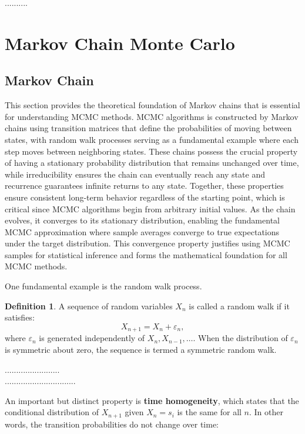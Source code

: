 \documentclass[12pt,a4paper,oneside]{book}
\theoremstyle{definition}
\newtheorem{definition}{Definition}[section]
\begin{document}
..........


\section{Markov Chain Monte Carlo}

\subsection{Markov Chain}

This section provides the theoretical foundation of Markov chains that is essential for understanding MCMC methods. MCMC algorithms is constructed by Markov chains using transition matrices that define the probabilities of moving between states, with random walk processes serving as a fundamental example where each step moves between neighboring states. These chains possess the crucial property of having a stationary probability distribution that remains unchanged over time, while irreducibility ensures the chain can eventually reach any state and recurrence guarantees infinite returns to any state. Together, these properties ensure consistent long-term behavior regardless of the starting point, which is critical since MCMC algorithms begin from arbitrary initial values. As the chain evolves, it converges to its stationary distribution, enabling the fundamental MCMC approximation where sample averages converge to true expectations under the target distribution. This convergence property justifies using MCMC samples for statistical inference and forms the mathematical foundation for all MCMC methods.

One fundamental example is the random walk process.

\begin{definition}
A sequence of random variables ${X_n}$ is called a random walk if it satisfies:
\begin{equation}
X_{n+1} = X_n + \varepsilon_n,
\end{equation}
where $\varepsilon_n$ is generated independently of $X_n, X_{n-1}, \ldots$. When the distribution of $\varepsilon_n$ is symmetric about zero, the sequence is termed a symmetric random walk.
\end{definition}


........................\\

...............................

An important but distinct property is \textbf{time homogeneity}, which states that the conditional distribution of $X_{n+1}$ given $X_n = s_i$ is the same for all $n$. In other words, the transition probabilities do not change over time:
\end{document}
